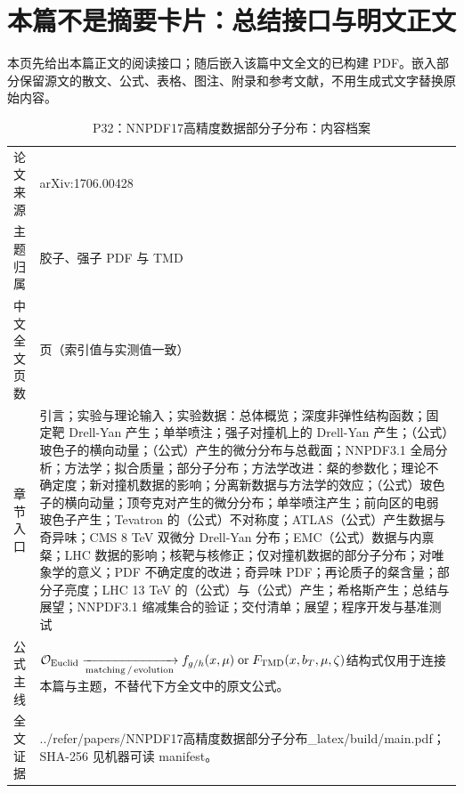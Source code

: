 \documentclass[UTF8,11pt,oneside]{ctexbook}
\begin{document}
\section*{本篇不是摘要卡片：总结接口与明文正文}
本页先给出本篇正文的阅读接口；随后嵌入该篇中文全文的已构建 PDF。嵌入部分保留源文的散文、公式、表格、图注、附录和参考文献，不用生成式文字替换原始内容。
\begin{table}[htbp]
  \centering
  \caption{P32：NNPDF17高精度数据部分子分布：内容档案}
  \small
  \begin{tabularx}{0.96\textwidth}{@{}p{3.3cm}>{\raggedright\arraybackslash}X@{}}
    \toprule
    论文来源 & arXiv:1706.00428 \\
    主题归属 & 胶子、强子 PDF 与 TMD \\
    中文全文页数 & 100 页（索引值与实测值一致） \\
    章节入口 & 引言；实验与理论输入；实验数据：总体概览；深度非弹性结构函数；固定靶 Drell-Yan 产生；单举喷注；强子对撞机上的 Drell-Yan 产生；（公式）玻色子的横向动量；（公式）产生的微分分布与总截面；NNPDF3.1 全局分析；方法学；拟合质量；部分子分布；方法学改进：粲的参数化；理论不确定度；新对撞机数据的影响；分离新数据与方法学的效应；（公式）玻色子的横向动量；顶夸克对产生的微分分布；单举喷注产生；前向区的电弱玻色子产生；Tevatron 的（公式）不对称度；ATLAS（公式）产生数据与奇异味；CMS 8 TeV 双微分 Drell-Yan 分布；EMC（公式）数据与内禀粲；LHC 数据的影响；核靶与核修正；仅对撞机数据的部分子分布；对唯象学的意义；PDF 不确定度的改进；奇异味 PDF；再论质子的粲含量；部分子亮度；LHC 13 TeV 的（公式）与（公式）产生；希格斯产生；总结与展望；NNPDF3.1 缩减集合的验证；交付清单；展望；程序开发与基准测试 \\
    公式主线 & $\mathcal O_{\rm Euclid}\xrightarrow[\rm matching\,/\,evolution]{}f_{g/h}(x,\mu)\;{\rm or}\;F_{\rm TMD}(x,b_T,\mu,\zeta)$\newline\scriptsize 结构式仅用于连接本篇与主题，不替代下方全文中的原文公式。 \\
    全文证据 & ../\allowbreak{}refer/\allowbreak{}papers/\allowbreak{}NNPDF17高精度数据部分子分布\_\allowbreak{}latex/\allowbreak{}build/\allowbreak{}main.pdf；SHA-256 见机器可读 manifest。 \\
    \bottomrule
  \end{tabularx}
\end{table}
\end{document}
